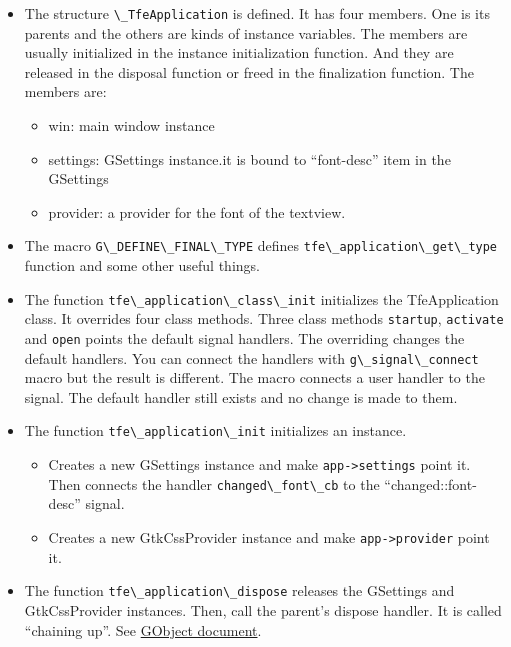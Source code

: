 \begin{itemize}
\tightlist
\item
  The structure \passthrough{\lstinline!\_TfeApplication!} is defined.
  It has four members. One is its parents and the others are kinds of
  instance variables. The members are usually initialized in the
  instance initialization function. And they are released in the
  disposal function or freed in the finalization function. The members
  are:

  \begin{itemize}
  \tightlist
  \item
    win: main window instance
  \item
    settings: GSettings instance.it is bound to ``font-desc'' item in
    the GSettings
  \item
    provider: a provider for the font of the textview.
  \end{itemize}
\item
  The macro \passthrough{\lstinline!G\_DEFINE\_FINAL\_TYPE!} defines
  \passthrough{\lstinline!tfe\_application\_get\_type!} function and
  some other useful things.
\item
  The function \passthrough{\lstinline!tfe\_application\_class\_init!}
  initializes the TfeApplication class. It overrides four class methods.
  Three class methods \passthrough{\lstinline!startup!},
  \passthrough{\lstinline!activate!} and \passthrough{\lstinline!open!}
  points the default signal handlers. The overriding changes the default
  handlers. You can connect the handlers with
  \passthrough{\lstinline!g\_signal\_connect!} macro but the result is
  different. The macro connects a user handler to the signal. The
  default handler still exists and no change is made to them.
\item
  The function \passthrough{\lstinline!tfe\_application\_init!}
  initializes an instance.

  \begin{itemize}
  \tightlist
  \item
    Creates a new GSettings instance and make
    \passthrough{\lstinline!app->settings!} point it. Then connects the
    handler \passthrough{\lstinline!changed\_font\_cb!} to the
    ``changed::font-desc'' signal.
  \item
    Creates a new GtkCssProvider instance and make
    \passthrough{\lstinline!app->provider!} point it.
  \end{itemize}
\item
  The function \passthrough{\lstinline!tfe\_application\_dispose!}
  releases the GSettings and GtkCssProvider instances. Then, call the
  parent's dispose handler. It is called ``chaining up''. See
  \href{https://docs.gtk.org/gobject/tutorial.html\#chaining-up}{GObject
  document}.
\end{itemize}

